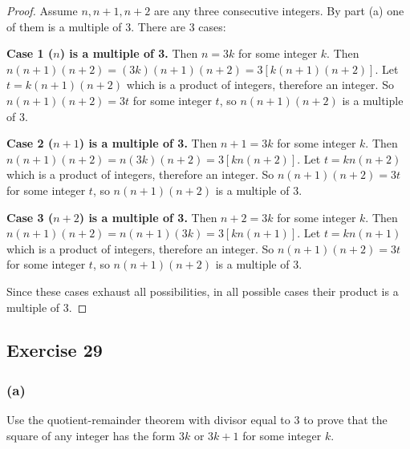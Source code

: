 \documentclass[14pt]{extarticle}
\begin{document}
\begin{proof}
    Assume $n, n+1, n+2$ are any three consecutive integers. By part (a) one of them is a multiple of 3. There are 3 cases:

    {\bf Case 1 ($n$) is a multiple of 3.} Then $n = 3k$ for some integer $k$. Then $n(n+1)(n+2) = (3k)(n+1)(n+2) = 3[k(n+1)(n+2)]$. Let $t = k(n+1)(n+2)$ which is a product of integers, therefore an integer. So $n(n+1)(n+2) = 3t$ for some integer $t$, so $n(n+1)(n+2)$ is a multiple of 3.

        {\bf Case 2 ($n+1$) is a multiple of 3.} Then $n+1 = 3k$ for some integer $k$. Then $n(n+1)(n+2) = n(3k)(n+2) = 3[kn(n+2)]$. Let $t = kn(n+2)$ which is a product of integers, therefore an integer. So $n(n+1)(n+2) = 3t$ for some integer $t$, so $n(n+1)(n+2)$ is a multiple of 3.

        {\bf Case 3 ($n+2$) is a multiple of 3.} Then $n+2 = 3k$ for some integer $k$. Then $n(n+1)(n+2) = n(n+1)(3k) = 3[kn(n+1)]$. Let $t = kn(n+1)$ which is a product of integers, therefore an integer. So $n(n+1)(n+2) = 3t$ for some integer $t$, so $n(n+1)(n+2)$ is a multiple of 3.

    Since these cases exhaust all possibilities, in all possible cases their product is a multiple of 3.
\end{proof}

\subsection{Exercise 29}

\subsubsection{(a)}
Use the quotient-remainder theorem with divisor equal to 3 to prove that the square of any integer has the form $3k$ or $3k + 1$ for some integer $k$.
\end{document}
